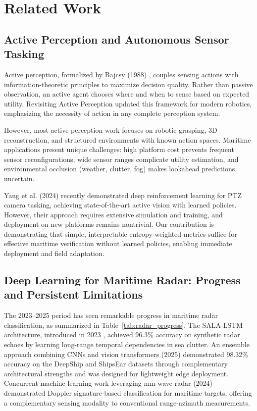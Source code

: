 \documentclass[twocolumn, 10pt]{article}
\begin{document}
\section{Related Work}

\subsection{Active Perception and Autonomous Sensor Tasking}

Active perception, formalized by Bajcsy (1988) \cite{Bajcsy1988ActivePerception}, couples sensing actions with information-theoretic principles to maximize decision quality. Rather than passive observation, an active agent chooses where and when to sense based on expected utility. Revisiting Active Perception \cite{BajcsyAloimonosTsotsos2016Revisiting} updated this framework for modern robotics, emphasizing the necessity of action in any complete perception system.

However, most active perception work focuses on robotic grasping, 3D reconstruction, and structured environments with known action spaces. Maritime applications present unique challenges: high platform cost prevents frequent sensor reconfigurations, wide sensor ranges complicate utility estimation, and environmental occlusion (weather, clutter, fog) makes lookahead predictions uncertain.

Yang et al. (2024) \cite{Yang2024PTZRL} recently demonstrated deep reinforcement learning for PTZ camera tasking, achieving state-of-the-art active vision with learned policies. However, their approach requires extensive simulation and training, and deployment on new platforms remains nontrivial. Our contribution is demonstrating that simple, interpretable entropy-weighted metrics suffice for effective maritime verification without learned policies, enabling immediate deployment and field adaptation.

\subsection{Deep Learning for Maritime Radar: Progress and Persistent Limitations}

The 2023--2025 period has seen remarkable progress in maritime radar classification, as summarized in Table~\ref{tab:radar_progress}. The SALA-LSTM architecture, introduced in 2023 \cite{Wang2023SALALSTM}, achieved 96.3\% accuracy on synthetic radar echoes by learning long-range temporal dependencies in sea clutter. An ensemble approach combining CNNs and vision transformers (2025) \cite{Cao2025VesselCNN} demonstrated 98.32\% accuracy on the DeepShip and ShipsEar datasets through complementary architectural strengths and was designed for lightweight edge deployment. Concurrent machine learning work leveraging mm-wave radar (2024) \cite{Rahman2024RadarClassification} demonstrated Doppler signature-based classification for maritime targets, offering a complementary sensing modality to conventional range-azimuth measurements.
\end{document}
